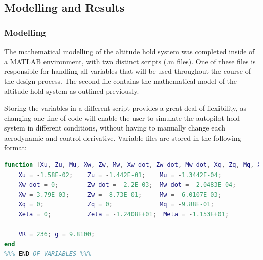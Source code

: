 \documentclass[stu, a4paper, 12pt, floatsintext]{apa7}
\numberwithin{figure}{section}
\numberwithin{table}{section}
\numberwithin{equation}{section}
\begin{document}
\subsection{Modelling and Results}
\subsubsection{Modelling}
The mathematical modelling of the altitude hold system was completed inside of a MATLAB environment, with two distinct scripts (.m files). One of these files is responsible for handling all variables that will be used throughout the course of the design process. The second file contains the mathematical model of the altitude hold system as outlined previously. 

Storing the variables in a different script provides a great deal of flexibility, as changing one line of code will enable the user to simulate the autopilot hold system in different conditions, without having to manually change each aerodynamic and control derivative. Variable files are stored in the following format:

\begin{lstlisting}[language=MATLAB]
%%% Stability and Control Derivatives %%%
function [Xu, Zu, Mu, Xw, Zw, Mw, Xw_dot, Zw_dot, Mw_dot, Xq, Zq, Mq, Xeta, Zeta, Meta, VR, g] = final_assignment_variables()
    Xu = -1.58E-02;    Zu = -1.442E-01;    Mu = -1.3442E-04;
    Xw_dot = 0;        Zw_dot = -2.2E-03;  Mw_dot = -2.0483E-04;
    Xw = 3.79E-03;     Zw = -8.73E-01;     Mw = -6.0107E-03;
    Xq = 0;            Zq = 0;             Mq = -9.88E-01;
    Xeta = 0;          Zeta = -1.2408E+01;  Meta = -1.153E+01;
    
    VR = 236; g = 9.8100;
end
%%% END OF VARIABLES %%%
\end{lstlisting}
\end{document}
